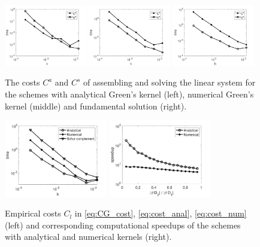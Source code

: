 \begin{figure}[!t]
	\centering
    \includegraphics[width=0.32\textwidth]{IV_ex1_anGF_cost_per_step}
    \includegraphics[width=0.32\textwidth]{IV_ex1_numGF_cost_per_step}
    \includegraphics[width=0.32\textwidth]{IV_ex1_Schur_cost_per_step}
	\caption[The costs $C^a$ and $C^s$ of assembling and solving the linear system]{ The costs $C^a$ and $C^s$ of assembling and solving the linear system for the schemes with analytical Green's kernel (left), numerical Green's kernel (middle) and fundamental solution (right).}
	\label{fig:ex1_cost_per_step}
\end{figure}


\begin{figure}[!t]
	\centering
    \includegraphics[width=0.4\textwidth]{costs_per_step}
    \quad
    \includegraphics[width=0.4\textwidth]{speedup}
	\caption{ Empirical costs $C_l$ in \eqref{eq:CG_cost}, \eqref{eq:cost_anal}, \eqref{eq:cost_num} (left) and corresponding computational speedups of the schemes with analytical and numerical kernels (right).}
	\label{fig:ex1_speedup}
\end{figure}




